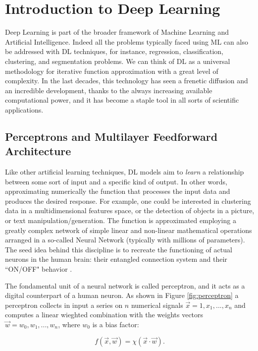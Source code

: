 \section{Introduction to Deep Learning} \label{ssec:DL}
Deep Learning is part of the broader framework of Machine Learning and Artificial Intelligence. Indeed all the problems typically faced using ML can also be addressed with DL techniques, for instance, regression, classification, clustering, and segmentation problems. We can think of DL as a universal methodology for iterative function approximation with a great level of complexity. In the last decades, this technology has seen a frenetic diffusion and an incredible development, thanks to the always increasing available computational power, and it has become a staple tool in all sorts of scientific applications.

\subsection{Perceptrons and Multilayer Feedforward Architecture}
Like other artificial learning techniques, DL models aim to \textit{learn} a relationship between some sort of input and a specific kind of output. In other words,  approximating numerically the function that processes the input data and produces the desired response. For example, one could be interested in clustering data in a multidimensional features space, or the detection of objects in a picture, or text manipulation/generation. The function is approximated employing a greatly complex network of simple linear and non-linear mathematical operations arranged in a so-called Neural Network (typically with millions of parameters). The seed idea behind this discipline is to recreate the functioning of actual neurons in the human brain: their entangled connection system and their ``ON/OFF" behavior \cite{10.5555/3275328}.

The fondamental unit of a neural network is called perceptron, and it acts as a digital counterpart of a human neuron. As shown in Figure \ref{fig:perceptron} a perceptron collects in input a series on $n$ numerical signals $\vec{x} = 1, x_1, ..., x_n $ and computes a linear wieghted combination with the weights vectors $\vec{w} = w_0, w_1, ..., w_n$, where $w_0$ is a bias factor:

\begin{equation}
    f(\vec{x},\vec{w}) = \chi(\vec{x} \cdot \vec{w}).
\end{equation}

